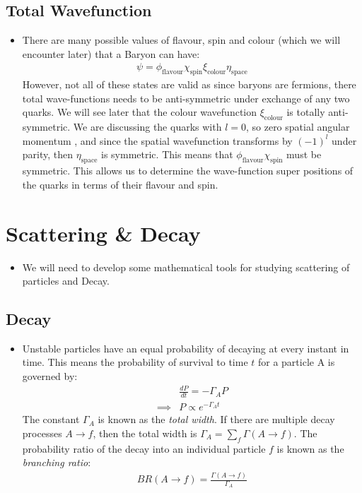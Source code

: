 \documentclass[11pt]{article}
\numberwithin{equation}{section}
\begin{document}
\subsection{Total Wavefunction} %
\label{sub:total_wavefunction}
\begin{itemize}
    \item There are many possible values of flavour, spin and colour (which we will encounter later) that a Baryon can have:
    \begin{align*}
        \psi = \phi_{\text{flavour}}\chi_{\text{spin}}\xi_{\text{colour}}\eta_{\text{space}}
    \end{align*}
    However, not all of these states are valid as since baryons are fermions, there total wave-functions needs to be anti-symmetric under exchange of any two quarks. We will see later that the colour wavefunction $\xi_{\text{colour}}$ is totally anti-symmetric. We are discussing the quarks with $l=0$, so zero spatial angular momentum , and since the spatial wavefunction transforms by $(-1)^l$ under parity, then $\eta_{\text{space}}$ is symmetric. This means that $ \phi_{\text{flavour}}\chi_{\text{spin}}$ must be symmetric. This allows us to determine the wave-function super positions of the quarks in terms of their flavour and spin. 
\end{itemize}



\newpage
\section{Scattering \& Decay} %
\label{sec:scattering}
\begin{itemize}
    \item We will need to develop some mathematical tools for studying scattering of particles and Decay.
\end{itemize}

\subsection{Decay} %
 \label{sub:decay}
 \begin{itemize}
     \item Unstable particles have an equal probability of decaying at every instant in time. This means the probability of survival to time $t$ for a particle A is governed by:
     \begin{align*}
         &\frac{dP}{dt} = -\Gamma_A P \\
         \implies & P \propto e^{-\Gamma_At}
     \end{align*}
     The constant $\Gamma_A$ is known as the \emph{total width}. If there are multiple decay processes $A \rightarrow f$, then the total width is $\Gamma_A = \sum_f\Gamma(A \rightarrow f)$. The probability ratio of the decay into an individual particle $f$ is known as the \emph{branching ratio}: 
     \begin{align*}
         BR(A \rightarrow f) = \frac{\Gamma(A\rightarrow f)}{\Gamma_A} 
     \end{align*}
 \end{itemize}
\end{document}
